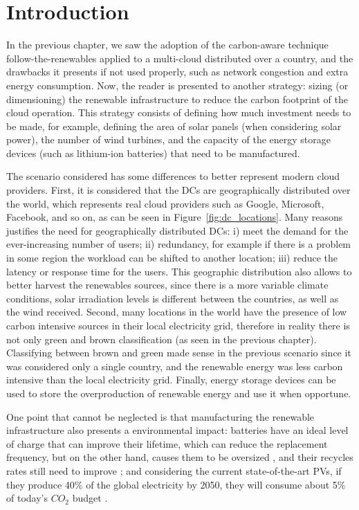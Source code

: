 \section{Introduction}

In the previous chapter, we saw the adoption of the carbon-aware technique follow-the-renewables applied to a multi-cloud distributed over a country, and the drawbacks it presents if not used properly, such as network congestion and extra energy consumption. Now, the reader is presented to another strategy: sizing (or dimensioning) the renewable infrastructure to reduce the carbon footprint of the cloud operation. This strategy consists of defining how much investment needs to be made, for example, defining the area of solar panels (when considering solar power), the number of wind turbines, and the capacity of the energy storage devices (such as lithium-ion batteries) that need to be manufactured. 

The scenario considered has some differences to better represent modern cloud providers. First, it is considered that the DCs are geographically distributed over the world, which represents real cloud providers such as Google, Microsoft, Facebook, and so on, as can be seen in Figure~\ref{fig:dc_locations}. Many reasons justifies the need for geographically distributed DCs: i) meet the demand for the ever-increasing number of users; ii) redundancy, for example if there is a problem in some region the workload can be shifted to another location; iii) reduce the latency or response time for the users. This geographic distribution also allows to better harvest the renewables sources, since there is a more variable climate conditions, solar irradiation levels is different between the countries, as well as the wind received. Second, many locations in the world have the presence of low carbon intensive sources in their local electricity grid, therefore in reality there is not only green and brown classification (as seen in the previous chapter). Classifying between brown and green made sense in the previous scenario since it was considered only a single country, and the renewable energy was less carbon intensive than the local electricity grid. Finally, energy storage devices can be used to store the overproduction of renewable energy and use it when opportune.

One point that cannot be neglected is that manufacturing the renewable infrastructure also presents a environmental impact: batteries have an ideal level of charge that can improve their lifetime, which can reduce the replacement frequency, but on the other hand, causes them to be oversized \cite{batteries_baumman}, and their recycles rates still need to improve \cite{bateries_RAHMAN}; and considering the current state-of-the-art PVs, if they produce 40\% of the global electricity by 2050, they will consume about 5\% of today’s ${CO_2}$ budget \cite{solar_co2}.

